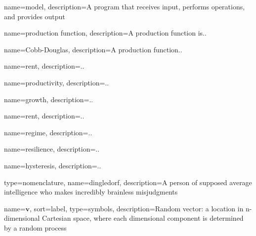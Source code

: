 {
name=model,
description={A program that receives input, performs operations, 
						and provides output}
}

{
name=production function,
description={A production function is..}
}

{
name=Cobb-Douglas,
description={A production function..}
}

{
name=rent,
description={..}
}

{
name=productivity,
description={..}
}

{
name=growth,
description={..}
}

{
name=rent,
description={..}
}


{
name=regime,
description={..}
}

{
name=resilience,
description={..}
}

{
name=hysteresis,
description={..}
}


{
type=nomenclature,
name=dingledorf,
description={A person of supposed average intelligence who makes incredibly brainless misjudgments}
}



{
name={$\mathbf{v}$},
sort={label},
type=symbols,
description={Random vector: a location in n-dimensional Cartesian space, where each dimensional component is determined by a random process}
}